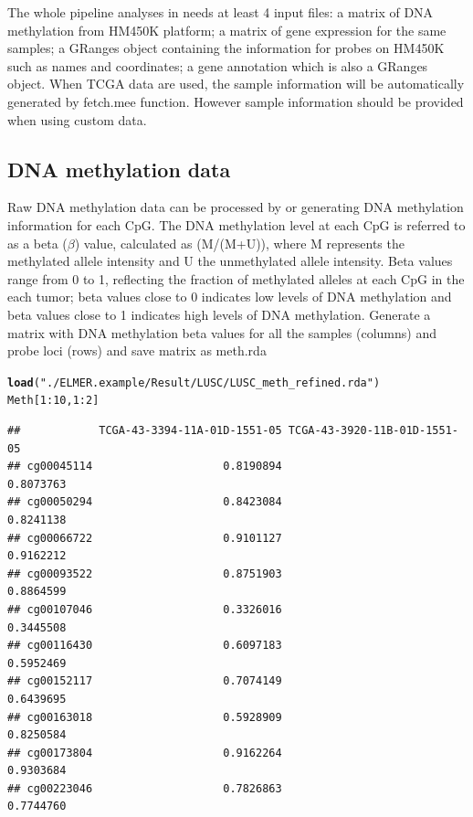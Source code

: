 \documentclass{article}\usepackage[]{graphicx}\usepackage[]{color}
\makeatletter
\newcommand{\hlnum}[1]{\textcolor[rgb]{0.686,0.059,0.569}{#1}}%
\newcommand{\hlstr}[1]{\textcolor[rgb]{0.192,0.494,0.8}{#1}}%
\newcommand{\hlopt}[1]{\textcolor[rgb]{0,0,0}{#1}}%
\newcommand{\hlstd}[1]{\textcolor[rgb]{0.345,0.345,0.345}{#1}}%
\newcommand{\hlkwd}[1]{\textcolor[rgb]{0.737,0.353,0.396}{\textbf{#1}}}%
\newenvironment{kframe}{%
 \def\at@end@of@kframe{}%
 \ifinner\ifhmode%
  \def\at@end@of@kframe{\end{minipage}}%
  \begin{minipage}{\columnwidth}%
 \fi\fi%
 \def\FrameCommand##1{\hskip\@totalleftmargin \hskip-\fboxsep
 \colorbox{shadecolor}{##1}\hskip-\fboxsep
     \hskip-\linewidth \hskip-\@totalleftmargin \hskip\columnwidth}%
 \MakeFramed {\advance\hsize-\width
   \@totalleftmargin\z@ \linewidth\hsize
   \@setminipage}}%
 {\par\unskip\endMakeFramed%
 \at@end@of@kframe}
\newenvironment{knitrout}{}{} %
\makeatother
\begin{document}
The whole pipeline analyses in  needs at least 4 input files:
a matrix of DNA methylation from HM450K platform; a matrix of gene expression for the 
same samples; a GRanges object containing the information for probes on HM450K such as names 
and coordinates; a gene annotation which is also a GRanges object. When TCGA data are used,
the sample information will be automatically generated by fetch.mee function. However
sample information should be provided when using custom data.

\subsection{DNA methylation data}
Raw DNA methylation data can be processed by  or 
generating DNA methylation information for each CpG. The DNA methylation level 
at each CpG is referred to as a beta ($\beta$) value, calculated as (M/(M+U)), 
where M represents the methylated allele intensity and U the unmethylated allele 
intensity. Beta values range from 0 to 1, reflecting the fraction of methylated 
alleles at each CpG in the each tumor; beta values close to 0 indicates low 
levels of DNA methylation and beta values close to 1 indicates high levels 
of DNA methylation. Generate a matrix with DNA methylation beta values for all
the samples (columns) and probe loci (rows) and save matrix as meth.rda

\begin{knitrout}
\color{fgcolor}\begin{kframe}
\begin{alltt}
\hlkwd{load}\hlstd{(}\hlstr{"./ELMER.example/Result/LUSC/LUSC_meth_refined.rda"}\hlstd{)}
\hlstd{Meth[}\hlnum{1}\hlopt{:}\hlnum{10}\hlstd{,} \hlnum{1}\hlopt{:}\hlnum{2}\hlstd{]}
\end{alltt}
\begin{verbatim}
##            TCGA-43-3394-11A-01D-1551-05 TCGA-43-3920-11B-01D-1551-05
## cg00045114                    0.8190894                    0.8073763
## cg00050294                    0.8423084                    0.8241138
## cg00066722                    0.9101127                    0.9162212
## cg00093522                    0.8751903                    0.8864599
## cg00107046                    0.3326016                    0.3445508
## cg00116430                    0.6097183                    0.5952469
## cg00152117                    0.7074149                    0.6439695
## cg00163018                    0.5928909                    0.8250584
## cg00173804                    0.9162264                    0.9303684
## cg00223046                    0.7826863                    0.7744760
\end{verbatim}
\end{kframe}
\end{knitrout}
\end{document}
